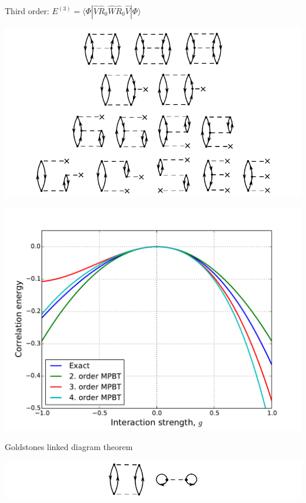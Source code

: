 \documentclass[12pt]{beamer}
\newcommand{\op}[1]{\hat{#1}}
\newcommand{\braopket}[3]{\langle #1 | {#2} | #3 \rangle}
\begin{document}
\begin{frame}[fragile]
Third order: $E^{(3)} = \braopket{\Phi}{\op{V}\op{R}_0\op{W}\op{R}_0\op{V}}{\Phi}$
\begin{center}
\includegraphics[width=\textwidth]{pres7}	
\end{center}
\end{frame}

\begin{frame}[fragile]
\begin{center}
\includegraphics[width=\textwidth]{pert_2}	
\end{center}
\end{frame}

\begin{frame}[fragile]
{\large \color{DarkFern} Goldstones linked diagram theorem}
\begin{center}
\includegraphics[width=\textwidth]{pres8}	
\end{center}
\end{frame}
\end{document}
